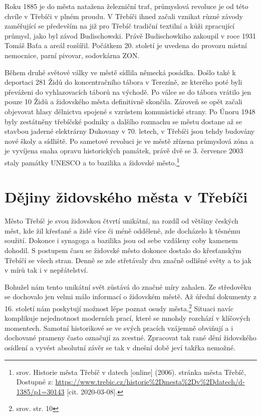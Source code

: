 \documentclass[a4paper,oneside,12pt]{report}
\begin{document}
Roku 1885 je do města natažena železniční trať, průmyslová revoluce je od této chvíle v Třebíči v plném proudu.
V Třebíči ihned začali vznikat různé závody zaměřující se především na již pro Třebíč tradiční textilní a kůži zpracující průmysl, jako byl závod Budischowski.
Právě Budischowkiho zakoupil v roce 1931 Tomáš Baťa a areál rozšířil.
Počátkem 20. století je uvedena do provozu místní nemocnice, parní pivovar, sodovkárna ZON.

Během druhé světové války ve městě sídlila německá posádka.
Došlo také k deportaci 281 Židů do koncentračního tábora v Terezíně, ze kterého poté byli převáženi do vyhlazovacích táborů na východě.
Po válce se do tábora vrátilo jen pouze 10 Židů a  židovského města definitivně skončila.
Zároveň se opět začali objevovat hlasy dělnictva spojené s vzrůstem komunistické strany.
Po Únoru 1948 byly zestátněny třebíčské podniky a dalšího rozmachu se městu dostane až se stavbou jaderné elektrárny Dukovany v 70. letech, v Třebíči jsou tehdy budovány nové školy a sídliště.
Po sametové revoluci je ve městě zřízena průmyslová zóna a je vyvíjena snaha opravu historických památek, právě dvě se 3. července 2003 staly památky UNESCO a to bazilika a židovské město.\footnote{srov. Historie města Třebíč v datech [online] (2006). stránka města Třebíč, Dostupné z: \url{https://www.trebic.cz/historie\%2Dmesta\%2Dv\%2Ddatech/d-1385/p1=30143} [cit. 2020-03-08]. }


\chapter{Dějiny židovského města v Třebíči}

Město Třebíč je svou židovskou čtvrtí unikátní, na rozdíl od většiny českých měst, kde žil křesťané a židé více či méně odděleně, zde docházelo k těsnému soužití.
Dokonce i synagoga a bazilika jsou od sebe vzdáleny coby kamenem dohodil.
S postupem času se židovské město dokonce dostalo do  křesťanským Třebíčí se všech stran.
Denně se zde střetávaly dva značně odlišné světy a to jak v mírů tak i v nepřátelství.

Bohužel nám tento unikátní svět zůstává do značné míry zahalen.
Ze středověku se dochovalo jen velmi málo informací o židovském městě.
Až úřední dokumenty z 16. století nám poskytují možnost lépe poznat osudy města.\footnote{srov.  str. 10}
Situaci navíc komplikuje nejednotnost moderních prací, které se mnohdy rozchází v klíčových momentech.
Samotní historikové se ve svých pracích vzájemně obviňují a i dochované prameny často označují za zcestné.
Zpracovat tak rané dění židovského osídlení a vyvést absolutní závěr se tak v dnešní době jeví takřka nemožné.
\end{document}
